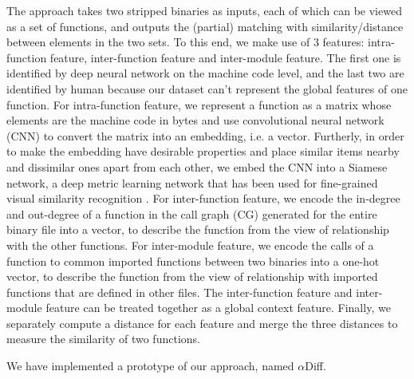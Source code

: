 \documentclass[10pt,conference]{IEEEtran}
\begin{document}
The approach takes two stripped binaries as inputs, each of which can be viewed as a set of functions, and outputs the (partial) matching with 
similarity/distance between elements in the two sets. 
To this end, we make use of 3 features: intra-function feature, inter-function feature and inter-module feature. 
The first one is identified by deep neural network on the machine code level, and the last two are identified by human because our 
dataset can’t represent the global features of one function. 
For intra-function feature, we represent a function \cite{schroff2015facenet} as a matrix whose elements are the machine code in bytes and use convolutional 
neural network (CNN) to convert the matrix into an embedding, i.e. a vector. Furtherly, in order to make the embedding have desirable 
properties and place similar items nearby and dissimilar ones apart from each other, we embed the CNN into a Siamese network, 
a deep metric learning network that has been used for fine-grained visual similarity recognition
 \cite{bromley1994signature}\cite{bell2015learning}\cite{schroff2015facenet}\cite{song2016deep}.
For inter-function feature, we encode the in-degree and out-degree of a function in the call graph (CG) generated for the entire binary 
file into a vector, to describe the function from the view of relationship with the other functions. 
For inter-module feature, we encode the calls of a function to common imported functions between two binaries into a one-hot vector, 
to describe the function from the view of relationship with imported functions that are defined in other files. 
The inter-function feature and inter-module feature can be treated together as a global context feature. 
{\color{red}Finally, we separately compute a distance for each feature and merge the three distances to measure the similarity of two functions.} 

We have implemented a prototype of our approach, named $\alpha$Diff.
{}
\end{document}

